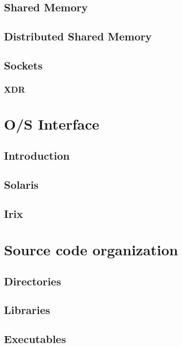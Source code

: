 \section{Shared Memory}


\section{Distributed Shared Memory}


\section{Sockets}

\subsection{XDR}




\chapter{O/S Interface}


\section{Introduction}


\section{Solaris}


\section{Irix}



\chapter{Source code organization}

\section{Directories}

\section{Libraries}

\section{Executables}













